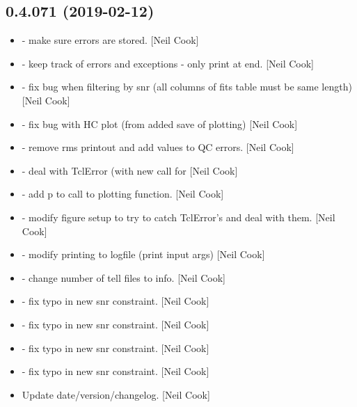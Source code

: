 \documentclass[a4paper,10pt,english]{report}
\begin{document}
\subsection{0.4.071 (2019-02-12)}
\label{\detokenize{misc/changelog:id186}}\begin{itemize}
\item {} 
 - make sure  errors are stored. {[}Neil
Cook{]}

\item {} 
 - keep track of errors and exceptions - only print
at end. {[}Neil Cook{]}

\item {} 
 - fix bug when filtering by snr (all columns of
fits table must be same length) {[}Neil Cook{]}

\item {} 
 - fix bug with HC plot (from added save of plotting)
{[}Neil Cook{]}

\item {} 
 - remove rms printout and add values to QC
errors. {[}Neil Cook{]}

\item {} 
 - deal with TclError (with new call for 
{[}Neil Cook{]}

\item {} 
 - add p to call to plotting function. {[}Neil
Cook{]}

\item {} 
 - modify figure setup to try to catch TclError’s and
deal with them. {[}Neil Cook{]}

\item {} 
 - modify printing to logfile (print input args)
{[}Neil Cook{]}

\item {} 
 - change number of tell files to info. {[}Neil
Cook{]}

\item {} 
 - fix typo in new snr constraint. {[}Neil Cook{]}

\item {} 
 - fix typo in new snr constraint. {[}Neil Cook{]}

\item {} 
 - fix typo in new snr constraint. {[}Neil Cook{]}

\item {} 
 - fix typo in new snr constraint. {[}Neil Cook{]}

\item {} 
Update date/version/changelog. {[}Neil Cook{]}

\end{itemize}
\end{document}
